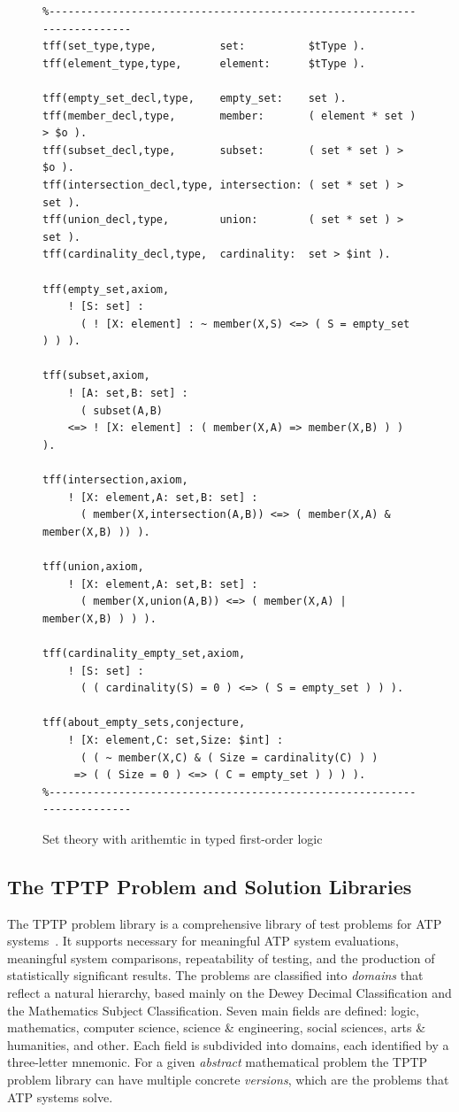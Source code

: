 \documentclass[runningheads]{llncs}
\begin{document}
\begin{figure}[htb]
\centering
{\footnotesize
{\setlength{\baselineskip}{3mm}
\begin{verbatim}
%------------------------------------------------------------------------
tff(set_type,type,          set:          $tType ).
tff(element_type,type,      element:      $tType ).

tff(empty_set_decl,type,    empty_set:    set ).
tff(member_decl,type,       member:       ( element * set ) > $o ).
tff(subset_decl,type,       subset:       ( set * set ) > $o ).
tff(intersection_decl,type, intersection: ( set * set ) > set ).
tff(union_decl,type,        union:        ( set * set ) > set ).
tff(cardinality_decl,type,  cardinality:  set > $int ).

tff(empty_set,axiom,
    ! [S: set] :
      ( ! [X: element] : ~ member(X,S) <=> ( S = empty_set ) ) ).

tff(subset,axiom,
    ! [A: set,B: set] :
      ( subset(A,B)
    <=> ! [X: element] : ( member(X,A) => member(X,B) ) ) ).

tff(intersection,axiom,
    ! [X: element,A: set,B: set] :
      ( member(X,intersection(A,B)) <=> ( member(X,A) & member(X,B) )) ).

tff(union,axiom,
    ! [X: element,A: set,B: set] :
      ( member(X,union(A,B)) <=> ( member(X,A) | member(X,B) ) ) ).

tff(cardinality_empty_set,axiom,
    ! [S: set] :
      ( ( cardinality(S) = 0 ) <=> ( S = empty_set ) ) ).

tff(about_empty_sets,conjecture,
    ! [X: element,C: set,Size: $int] :
      ( ( ~ member(X,C) & ( Size = cardinality(C) ) )
     => ( ( Size = 0 ) <=> ( C = empty_set ) ) ) ).
%------------------------------------------------------------------------
\end{verbatim}
}}
\caption{Set theory with arithemtic in typed first-order logic}
\label{ExampleTF0}
\end{figure}

\subsection{The TPTP Problem and Solution Libraries}
\label{TPTPTSTP}

The TPTP problem library is a comprehensive library of test problems for ATP systems~\cite{Sut09}.
It supports necessary for meaningful ATP system evaluations, meaningful system comparisons, 
repeatability of testing, and the production of statistically significant results. 
The problems are classified into {\em domains} that reflect a natural hierarchy,
based mainly on the Dewey Decimal Classification and the Mathematics Subject Classification.
Seven main fields are defined: logic, mathematics, computer science, science \& engineering, 
social sciences, arts \& humanities, and other. 
Each field is subdivided into domains, each identified by a three-letter mnemonic.
For a given {\em abstract} mathematical problem the TPTP problem library can have multiple 
concrete {\em versions}, which are the problems that ATP systems solve. 
\end{document}
